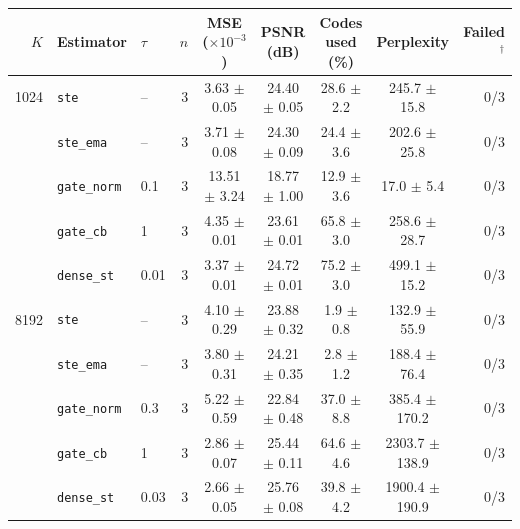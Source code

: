 \begin{tabular}{rllrccccr}
\toprule
$K$ & Estimator & $\tau$ & $n$ & MSE ($\times 10^{-3}$) & PSNR (dB) & Codes used (\%) & Perplexity & Failed$^\dagger$ \\
\midrule
1024 & \texttt{ste} & -- & 3 & 3.63 $\pm$ 0.05 & 24.40 $\pm$ 0.05 & 28.6 $\pm$ 2.2 & 245.7 $\pm$ 15.8 & 0/3 \\
 & \texttt{ste\_ema} & -- & 3 & 3.71 $\pm$ 0.08 & 24.30 $\pm$ 0.09 & 24.4 $\pm$ 3.6 & 202.6 $\pm$ 25.8 & 0/3 \\
 & \texttt{gate\_norm} & 0.1 & 3 & 13.51 $\pm$ 3.24 & 18.77 $\pm$ 1.00 & 12.9 $\pm$ 3.6 & 17.0 $\pm$ 5.4 & 0/3 \\
 & \texttt{gate\_cb} & 1 & 3 & 4.35 $\pm$ 0.01 & 23.61 $\pm$ 0.01 & 65.8 $\pm$ 3.0 & 258.6 $\pm$ 28.7 & 0/3 \\
 & \texttt{dense\_st} & 0.01 & 3 & 3.37 $\pm$ 0.01 & 24.72 $\pm$ 0.01 & 75.2 $\pm$ 3.0 & 499.1 $\pm$ 15.2 & 0/3 \\
\midrule
8192 & \texttt{ste} & -- & 3 & 4.10 $\pm$ 0.29 & 23.88 $\pm$ 0.32 & 1.9 $\pm$ 0.8 & 132.9 $\pm$ 55.9 & 0/3 \\
 & \texttt{ste\_ema} & -- & 3 & 3.80 $\pm$ 0.31 & 24.21 $\pm$ 0.35 & 2.8 $\pm$ 1.2 & 188.4 $\pm$ 76.4 & 0/3 \\
 & \texttt{gate\_norm} & 0.3 & 3 & 5.22 $\pm$ 0.59 & 22.84 $\pm$ 0.48 & 37.0 $\pm$ 8.8 & 385.4 $\pm$ 170.2 & 0/3 \\
 & \texttt{gate\_cb} & 1 & 3 & 2.86 $\pm$ 0.07 & 25.44 $\pm$ 0.11 & 64.6 $\pm$ 4.6 & 2303.7 $\pm$ 138.9 & 0/3 \\
 & \texttt{dense\_st} & 0.03 & 3 & 2.66 $\pm$ 0.05 & 25.76 $\pm$ 0.08 & 39.8 $\pm$ 4.2 & 1900.4 $\pm$ 190.9 & 0/3 \\
\bottomrule
\end{tabular}
